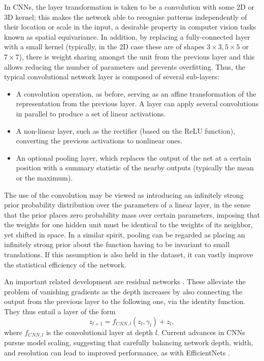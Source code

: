  In CNNs, the layer transformation is taken to be a convolution with some 2D or 3D kernel; this makes the network able to recognise patterns independently of their location or scale in the input, a desirable property in computer vision tasks known as spatial equivariance. In addition, by replacing a fully-connected layer with a small kernel (typically, in the 2D case these are of shapes $3\times3, 5\times 5$ or $7\times 7$), there is weight sharing amongst the unit from the previous layer and this allows reducing 
 the number of parameters and prevents overfitting.
 Thus, the typical convolutional network layer is composed of several sub-layers:
 \begin{itemize}
     \item A convolution operation, as before, 
     serving as an affine transformation of the representation from the previous layer. A layer can apply several convolutions in parallel to produce a set of linear activations.
     \item A non-linear layer, such as the rectifier (based on the ReLU function), converting the previous activations to nonlinear ones.
     \item An optional pooling layer, which replaces the output of the net at a certain position with a summary statistic of 
     the nearby outputs (typically the mean or the maximum).  
 \end{itemize}
 
 The use of the convolution may be viewed as introducing an inﬁnitely strong prior probability distribution over the parameters of a linear layer, in the sense that the prior places zero probability mass over certain parameters, imposing that the weights for one hidden unit must be identical to the weights of its neighbor, yet shifted in space. In a 
  similar spirit, pooling can be regarded as placing an inﬁnitely strong prior about the function having to be invariant to small translations. If this assumption is also held in the dataset, it can vastly improve the statistical eﬃciency of the network.
 
 An important related development are residual networks \cite{he2016deep}. These alleviate the problem of vanishing gradients as the depth increases by also connecting the output from the previous layer to the following one, via the identity function. They thus 
 entail a layer of the form 
$$
z_{l+1} = f_{CNN,l}(z_l, \gamma_l) + z_l ,
$$
where $f_{CNN,l}$ is the convolutional layer at depth $l$. Current advances in CNNs pursue model scaling, suggesting that carefully balancing network depth, width, and resolution can lead to improved performance,
as with EfficientNets \cite{tan2019efficientnet}.



